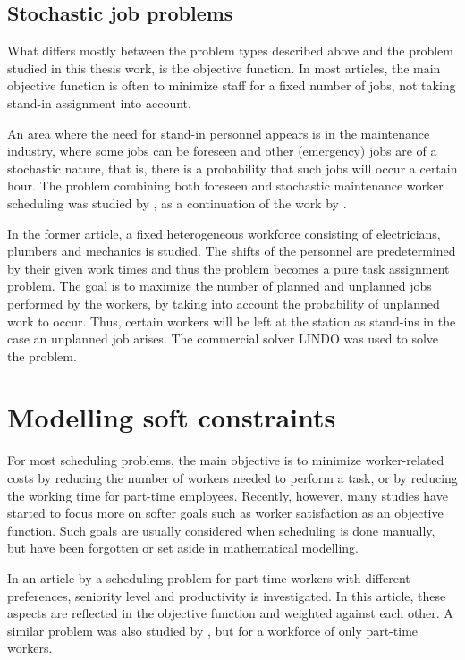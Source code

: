 \subsection{Stochastic job problems} \label{STOCH}
What differs mostly between the problem types described above and the problem studied in this thesis work, is the objective function. In most articles, the main objective function is often to minimize staff for a fixed number of jobs, not taking stand-in assignment into account.

An area where the need for stand-in personnel appears is in the  maintenance industry, where some jobs can be foreseen and other (emergency) jobs are of a stochastic nature, that is, there is a probability that such jobs will occur a certain hour. The problem combining both foreseen and stochastic maintenance worker scheduling was studied by \citet{duffuaa_1999}, as a continuation of the work by \citet{roberts_1983}. 

In the former article, a fixed heterogeneous workforce consisting of electricians, plumbers and mechanics is studied. The shifts of the personnel are predetermined by their given work times and thus the problem becomes a pure task assignment problem. The goal is to maximize the number of planned and unplanned jobs performed by the workers, by taking into account the probability of unplanned work to occur. Thus, certain workers will be left at the station as stand-ins in the case an unplanned job arises. The commercial solver LINDO was used to solve the problem.


\section{Modelling soft constraints} \label{MSC}
For most scheduling problems, the main objective is to minimize worker-related costs by reducing the number of workers needed to perform a task, or by reducing the working time for part-time employees. Recently, however, many studies have started to focus more on softer goals such as worker satisfaction as an objective function. Such goals are usually considered when scheduling is done manually, but have been forgotten or set aside in mathematical modelling.

 In an article by \citet{akbari_2013} a scheduling problem for part-time workers with different preferences, seniority level and productivity is investigated. In this article, these aspects are reflected in the objective function and weighted against each other. A similar problem was also studied by \citet{mohan_2008}, but for a workforce of only part-time workers. %


